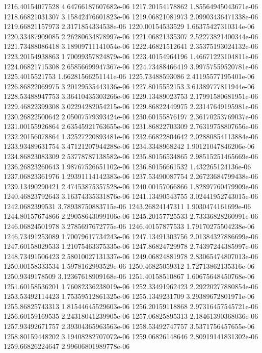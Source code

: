 {1216.40154077528 4.64766187607682e-06
1217.20154178862 1.85564945043671e-06
1218.66821031307 3.15842476601823e-06
1219.06821081973 2.09903436471338e-06
1219.66821157973 2.3171854334538e-06
1220.00154533529 1.66375427310314e-06
1220.33487909085 2.26280634878997e-06
1221.06821335307 2.52273821400344e-06
1221.73488086418 3.18909711141054e-06
1222.46821512641 2.35375193024132e-06
1223.20154938863 1.70099357824879e-06
1223.40154964196 1.46671223104811e-06
1224.06821715308 2.65856699947367e-06
1224.73488466419 3.99757559520781e-06
1225.4015521753 1.66281566251141e-06
1225.73488593086 2.41195577195401e-06
1226.86822069975 3.20129535443136e-06
1227.8015552153 3.61389777811944e-06
1228.53488947753 3.36410435303266e-06
1229.13489023753 2.17991580681951e-06
1229.46822399308 3.02294282054215e-06
1229.86822449975 2.23147649195981e-06
1230.26822500642 2.05007579393424e-06
1230.60155876197 2.36170253769037e-06
1231.00155926864 2.63545921763655e-06
1231.86822703309 2.76319758807656e-06
1232.20156078864 1.32527220893481e-06
1232.66822804642 2.02880854113884e-06
1233.93489631754 3.47121207944288e-06
1234.3348968242 1.90121047846206e-06
1234.86823083309 2.53778787138582e-06
1235.80156534865 2.98515251465669e-06
1236.26823260643 1.98767526651102e-06
1236.80156661532 1.432265124136e-06
1237.06823361976 1.29391114142383e-06
1237.53490087754 2.26723684799438e-06
1239.13490290421 2.47453875357528e-06
1240.00157066866 1.82897760479909e-06
1240.46823792643 3.16374335331876e-06
1241.13490543755 3.02441952743015e-06
1242.0682399531 3.78938750883715e-06
1243.26824147311 1.9030474161699e-06
1244.80157674866 2.29058643099106e-06
1245.20157725533 2.73336828260991e-06
1246.06824501978 3.2785697672775e-06
1246.40157877533 1.79170275504238e-06
1246.73491253089 1.70079617734243e-06
1247.13491303756 2.01384327886699e-06
1247.60158029533 1.21075463375335e-06
1247.86824729978 2.74397244385997e-06
1248.73491506423 2.58010027131337e-06
1249.06824881978 2.83065474807013e-06
1250.00158333534 1.5978162993529e-06
1250.46825059312 1.72713862135316e-06
1250.9349178509 3.12367618909168e-06
1251.40158510867 1.60675648450768e-06
1251.60158536201 1.76082336238019e-06
1252.33491962423 2.29220277880854e-06
1253.53492114423 1.75359512861325e-06
1255.1349231709 3.29389672801971e-06
1255.86825743313 1.81544645529603e-06
1256.20159118868 2.97316457545721e-06
1256.60159169535 2.24318041239905e-06
1257.06825895313 2.18461390368036e-06
1257.93492671757 2.39304365963563e-06
1258.53492747757 3.5371756457655e-06
1258.80159448202 3.19408282707072e-06
1259.06826148646 2.80919141831302e-06
1259.66826224647 2.99606801989778e-06
}
